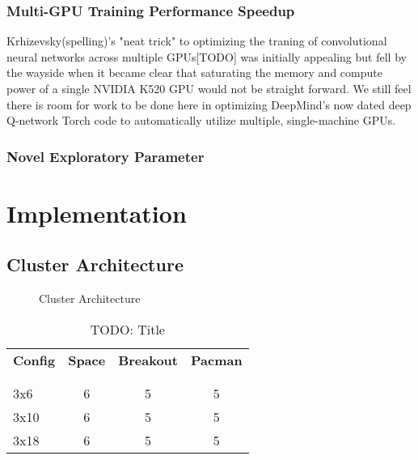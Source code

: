 \documentclass{article} %
\begin{document}
\subsubsection*{Multi-GPU Training Performance Speedup}
Krhizevsky(spelling)'s "neat trick" to optimizing the traning of convolutional neural networks
across multiple GPUs[TODO] was initially appealing but fell by the wayside when it became clear 
that saturating the memory and compute power of a single NVIDIA K520 GPU would not be straight 
forward. We still feel there is room for work to be done here in optimizing DeepMind's now dated
deep Q-network Torch code to automatically utilize multiple, single-machine GPUs.

\subsubsection*{Novel Exploratory Parameter}

\section{Implementation}

\subsection{Cluster Architecture}

\begin{figure}[H]
\begin{center}
\fbox{\rule[-.5cm]{0cm}{4cm} \rule[-.5cm]{4cm}{0cm}}
\end{center}
\caption{Cluster Architecture}
\end{figure}


\begin{table}[H]
\caption{TODO: Title}
\label{sample-table}
\begin{center}
    \begin{tabular}{l | ccc}
        {\bf Config} & \multicolumn{1}{c}{\bf Space}  & \multicolumn{1}{c}{\bf Breakout} & \multicolumn{1}{c}{\bf Pacman} \\
        \\ \hline \\
        3x6     &6 &5 &5 \\
        3x10    &6 &5 &5 \\
        3x18    &6 &5 &5 \\
    \end{tabular}
\end{center}
\end{table}
\end{document}
